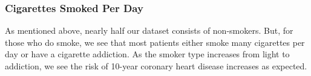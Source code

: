 \documentclass[10pt]{article}
\begin{document}
\begin{figure}[hbt!]
\hspace*{\fill}
\centering
{}\hspace{2em}%
%
\hspace*{\fill}
\end{figure}


\subsubsection*{Cigarettes Smoked Per Day}

As mentioned above, nearly half our dataset consists of non-smokers. But, for those who do smoke, we see that most patients either smoke many cigarettes per day or have a cigarette addiction. As the smoker type increases from light to addiction, we see the risk of 10-year coronary heart disease increases as expected. 
\end{document}
